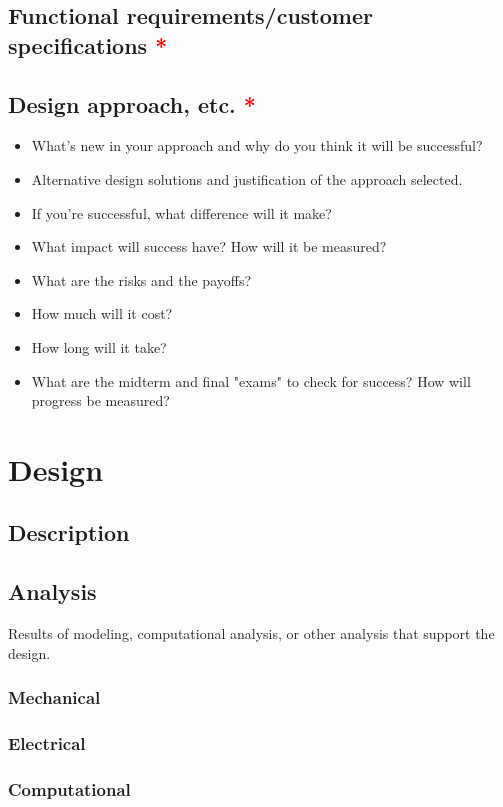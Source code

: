 \documentclass[]{aiaa-tc}%
\newcommand{\reqd}{\textcolor{red}{*}}
\begin{document}
\subsection{Functional requirements/customer specifications \reqd}

\subsection{Design approach, etc. \reqd}
\begin{itemize}
\item What's new in your approach and why do you think it will be successful?
\item Alternative design solutions and justification of the approach selected.\item If you're successful, what difference will it make?   
\item What impact will success have?  How will it be measured?
\item What are the risks and the payoffs?
\item How much will it cost?
\item How long will it take?
\item What are the midterm and final "exams" to check for success?  How will progress be measured?
\end{itemize}

\section{Design}

\subsection{Description}
\subsection{Analysis}

Results of modeling, computational analysis, or other analysis that support the design.
\subsubsection{Mechanical}
\subsubsection{Electrical}
\subsubsection{Computational}
\end{document}
